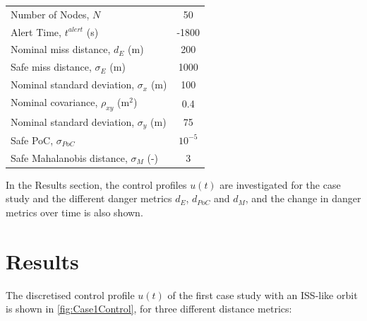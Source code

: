 \documentclass[letterpaper, preprint, paper,11pt]{AAS}	%
\begin{document}
\begin{table}[!h]
\begin{tabular}{|l|c|}
		Number of Nodes, $N$           & 50                             \\%
		Alert Time, $t^{alert}$ (s)   & -1800                              \\%
		Nominal miss distance, $d_{E}$ (m)    & 200                             \\%
		Safe miss distance, $\sigma_{E}$ (m)   & 1000                              \\%
		Nominal standard deviation, $\sigma_{x}$ (m)    &    100                        \\%
		Nominal covariance, $\rho_{xy}$ (m$^2$)    &            0.4                \\%
		Nominal standard deviation, $\sigma_{y}$ (m)    &  75                        \\%
		Safe PoC, $\sigma_{PoC}$     &  $10^{-5}$                           \\%
		Safe Mahalanobis distance, $\sigma_{M}$ (-)    &  3                        \\   \hline %
	\end{tabular}
\end{table}

In the Results section, the control profiles $u(t)$ are investigated for the case study and the different danger metrics $d_{E}$, $d_{PoC}$ and $d_{M}$, and the change in danger metrics over time is also shown.

\section{Results}\label{sec:Results}

The discretised control profile $u(t)$ of the first case study with an ISS-like orbit is shown in \autoref{fig:Case1Control}, for three different distance metrics:
\end{document}
